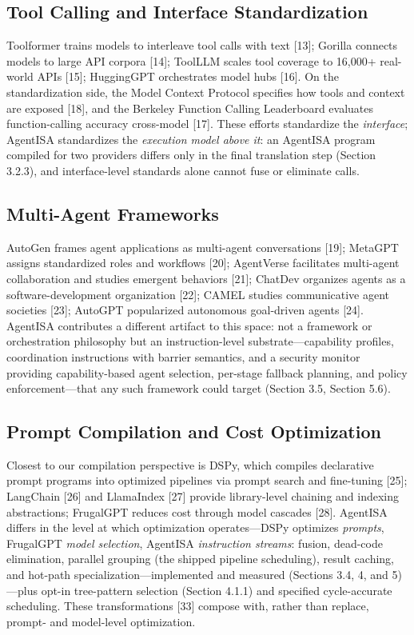 \documentclass[
  sigconf,
  anonymous]{acmart}
\begin{document}
\subsection{Tool Calling and Interface
Standardization}\label{tool-calling-and-interface-standardization}

Toolformer trains models to interleave tool calls with text {[}13{]};
Gorilla connects models to large API corpora {[}14{]}; ToolLLM scales
tool coverage to 16,000+ real-world APIs {[}15{]}; HuggingGPT
orchestrates model hubs {[}16{]}. On the standardization side, the Model
Context Protocol specifies how tools and context are exposed {[}18{]},
and the Berkeley Function Calling Leaderboard evaluates function-calling
accuracy cross-model {[}17{]}. These efforts standardize the
\emph{interface}; AgentISA standardizes the \emph{execution model above
it}: an AgentISA program compiled for two providers differs only in the
final translation step (Section 3.2.3), and interface-level standards
alone cannot fuse or eliminate calls.

\subsection{Multi-Agent Frameworks}\label{multi-agent-frameworks}

AutoGen frames agent applications as multi-agent conversations {[}19{]};
MetaGPT assigns standardized roles and workflows {[}20{]}; AgentVerse
facilitates multi-agent collaboration and studies emergent behaviors
{[}21{]}; ChatDev organizes agents as a software-development
organization {[}22{]}; CAMEL studies communicative agent societies
{[}23{]}; AutoGPT popularized autonomous goal-driven agents {[}24{]}.
AgentISA contributes a different artifact to this space: not a framework
or orchestration philosophy but an instruction-level
substrate---capability profiles, coordination instructions with barrier
semantics, and a security monitor providing capability-based agent
selection, per-stage fallback planning, and policy enforcement---that
any such framework could target (Section 3.5, Section 5.6).

\subsection{Prompt Compilation and Cost
Optimization}\label{prompt-compilation-and-cost-optimization}

Closest to our compilation perspective is DSPy, which compiles
declarative prompt programs into optimized pipelines via prompt search
and fine-tuning {[}25{]}; LangChain {[}26{]} and LlamaIndex {[}27{]}
provide library-level chaining and indexing abstractions; FrugalGPT
reduces cost through model cascades {[}28{]}. AgentISA differs in the
level at which optimization operates---DSPy optimizes \emph{prompts},
FrugalGPT \emph{model selection}, AgentISA \emph{instruction streams}:
fusion, dead-code elimination, parallel grouping (the shipped pipeline
scheduling), result caching, and hot-path specialization---implemented
and measured (Sections 3.4, 4, and 5)---plus opt-in tree-pattern
selection (Section 4.1.1) and specified cycle-accurate scheduling. These
transformations {[}33{]} compose with, rather than replace, prompt- and
model-level optimization.
\end{document}
